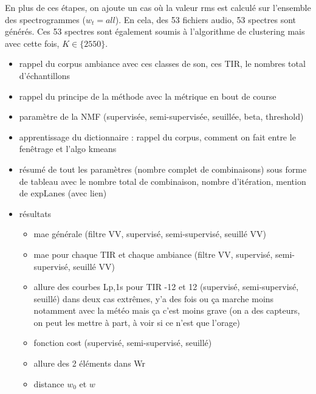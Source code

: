 En plus de ces étapes, on ajoute un cas où la valeur rms est calculé sur l'ensemble des spectrogrammes ($w_t = all$). En cela, des 53 fichiers audio, 53 spectres sont générés. Ces 53 spectres sont également soumis à l'algorithme de clustering mais avec cette fois, $K \in \lbrace 25 50 \rbrace$.



\begin{itemize}
\item rappel du corpus ambiance avec ces classes de son, ces TIR, le nombres total d'échantillons
\item rappel du principe de la méthode avec la métrique en bout de course
\item paramètre de la NMF (supervisée, semi-supervisée, seuillée, beta, threshold)
\item apprentissage du dictionnaire : rappel du corpus, comment on fait entre le fenêtrage et l'algo kmeans
\item résumé de tout les paramètres (nombre complet de combinaisons) sous forme de tableau avec le nombre total de combinaison, nombre d'itération, mention de expLanes (avec lien)
\item résultats
\begin{itemize}
\item mae générale (filtre VV, supervisé, semi-supervisé, seuillé VV)
\item mae pour chaque TIR et chaque ambiance (filtre VV, supervisé, semi-supervisé, seuillé VV)
\item allure des courbes Lp,1s pour TIR -12 et 12 (supervisé, semi-supervisé, seuillé) dans deux cas extrêmes, y'a des fois ou ça marche moins notamment avec la météo mais ça c'est moins grave (on a des capteurs, on peut les mettre à part, à voir si ce n'est que l'orage)
\item fonction cost (supervisé, semi-supervisé, seuillé)
\item allure des 2 éléments dans Wr
\item distance $w_0$ et $w$
\end{itemize}
\end{itemize}


